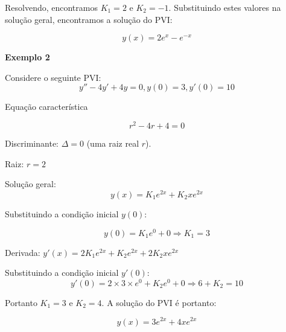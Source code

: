 \documentclass[a4paper]{article}
\begin{document}
\begin{multicols}{2}
Resolvendo, encontramos $K_1=2$ e $K_2=-1$. Substituindo estes valores
na solução geral, encontramos a solução do PVI:

\begin{displaymath}
  y(x) =  2e^x -e^{-x}
\end{displaymath}

\hrulefill

{\bf Exemplo 2}

Considere o seguinte PVI:
\begin{displaymath}
  y''-4y' +4y=0, y(0)=3, y'(0)=10
\end{displaymath}

Equação característica

\begin{displaymath}
  r^2-4r+4=0
\end{displaymath}

Discriminante: $\Delta=0$ (uma raiz real $r$).

Raiz: $r=2$

Solução geral:
\begin{displaymath}
  y(x) = K_1e^{2x} + K_2xe^{2x}
\end{displaymath}

Substituindo a condição inicial $y(0)$:

\begin{displaymath}
  y(0) = K_1e^0 + 0 \Rightarrow K_1=3
\end{displaymath}

Derivada: $y'(x) = 2K_1e^{2x} + K_2e^{2x} + 2K_2xe^{2x}$

Substituindo a condição inicial $y'(0)$:
\begin{displaymath}
  y'(0) = 2\times 3\times e^0 + K_2e^0 + 0 \Rightarrow 6+ K_2=10
\end{displaymath}

Portanto $K_1=3$ e $K_2=4$. A solução do PVI é portanto:

\begin{displaymath}
  y(x) = 3e^{2x} + 4xe^{2x}
\end{displaymath}


\end{multicols}
\end{document}
